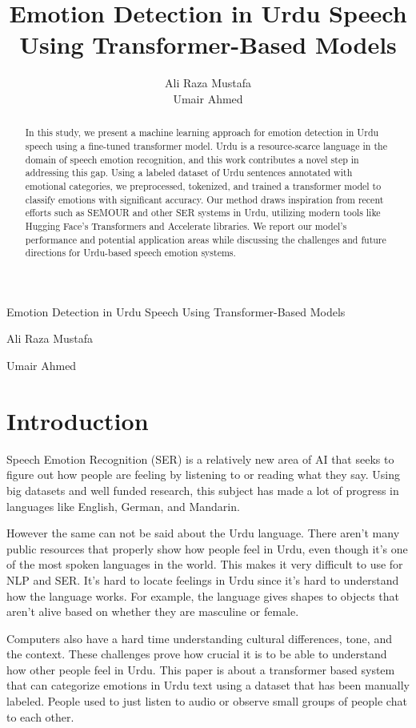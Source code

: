 \documentclass[12pt]{article}
\title{Emotion Detection in Urdu Speech Using Transformer-Based Models}
\author{Ali Raza Mustafa \\ Umair Ahmed}
\date{}
\begin{document}
\maketitle
Emotion Detection in Urdu Speech Using Transformer-Based Models

Ali Raza Mustafa

Umair Ahmed

\begin{abstract}
In this study, we present a machine learning approach for emotion detection in Urdu speech using a fine-tuned transformer model. Urdu is a resource-scarce language in the domain of speech emotion recognition, and this work contributes a novel step in addressing this gap. Using a labeled dataset of Urdu sentences annotated with emotional categories, we preprocessed, tokenized, and trained a transformer model to classify emotions with significant accuracy. Our method draws inspiration from recent efforts such as SEMOUR and other SER systems in Urdu, utilizing modern tools like Hugging Face’s Transformers and Accelerate libraries. We report our model’s performance and potential application areas while discussing the challenges and future directions for Urdu-based speech emotion systems.

\end{abstract}

\section{Introduction}

Speech Emotion Recognition (SER) is a relatively new area of AI that seeks to figure out how people are feeling by listening to or reading what they say. Using big datasets and well funded research, this subject has made a lot of progress in languages like English, German, and Mandarin.

However the same can not be said about the Urdu language. There aren't many public resources that properly show how people feel in Urdu, even though it's one of the most spoken languages in the world. This makes it very difficult to use for NLP and SER. It's hard to locate feelings in Urdu since it's hard to understand how the language works. For example, the language gives shapes to objects that aren't alive based on whether they are masculine or female.

Computers also have a hard time understanding cultural differences, tone, and the context. These challenges prove how crucial it is to be able to understand how other people feel in Urdu. This paper is about a transformer based system that can categorize emotions in Urdu text using a dataset that has been manually labeled. People used to just listen to audio or observe small groups of people chat to each other.
\end{document}
